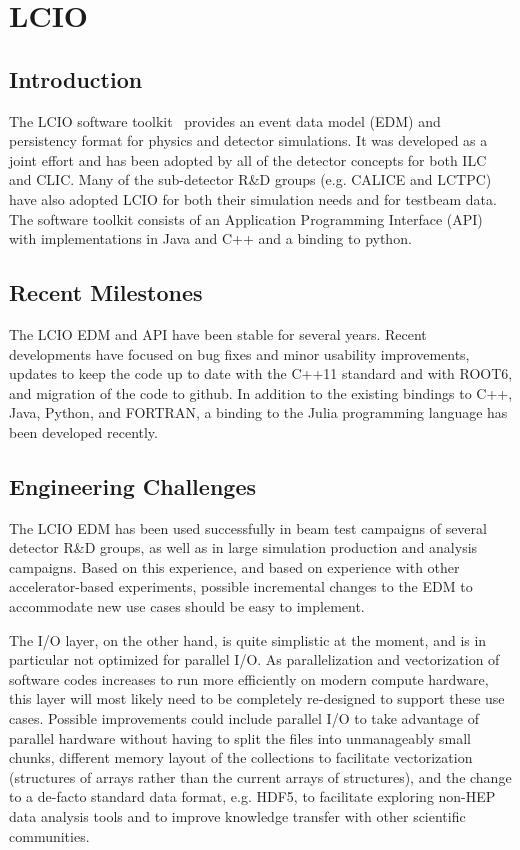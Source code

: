 \section{LCIO}

\subsection{Introduction}

The LCIO software toolkit~\cite{lcioWebsite} provides an event data model
(EDM) and persistency format for physics and detector
simulations. It was developed as a joint effort and has
been adopted by all of the detector concepts for both ILC and CLIC. Many of the sub-detector R\&D groups (e.g. CALICE and LCTPC) have also adopted LCIO for both their simulation needs and for testbeam data. The
software toolkit consists of an Application Programming Interface (API) with implementations in Java and C++ and a binding to python.
\subsection{Recent Milestones}
The LCIO EDM and API have been stable for several years. Recent developments have focused on bug fixes and minor usability improvements, updates to keep the code up to date with the C++11 standard and with ROOT6, and migration of the code to github. In addition to the existing bindings to C++, Java, Python, and FORTRAN, a binding to the Julia programming language has been developed recently.
\subsection{Engineering Challenges}
The LCIO EDM has been used successfully in beam test campaigns of several detector R\&D groups, as well as in large simulation production and analysis campaigns. Based on this experience, and based on experience with other accelerator-based experiments, possible incremental changes to the EDM to accommodate new use cases should be easy to implement.

The I/O layer, on the other hand, is quite simplistic at the moment, and is in particular not optimized for parallel I/O. As parallelization and vectorization of software codes increases to run more efficiently on modern compute hardware, this layer will most likely need to be completely re-designed to support these use cases. Possible improvements could include parallel I/O to take advantage of parallel hardware without having to split the files into unmanageably small chunks, different memory layout of the collections to facilitate vectorization (structures of arrays rather than the current arrays of structures), and the change to a de-facto standard data format, e.g. HDF5, to facilitate exploring non-HEP data analysis tools and to improve knowledge transfer with other scientific communities.


